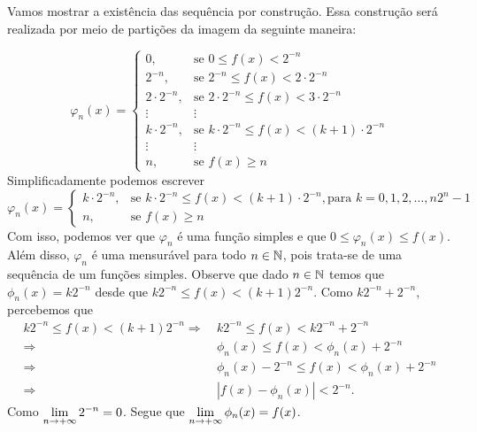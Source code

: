 \begin{prova}
	Vamos mostrar a existência das sequência por construção.
	Essa construção será realizada por meio de partições da imagem da seguinte maneira:
	
	$$
	\varphi_n(x) =\left\{
	\begin{array}{ll}
		0, & \textrm{se\ } 0 \leq f(x) < 2^{-n} \\
		2^{-n}, & \textrm{se\ } 2^{-n} \leq f(x) < 2\cdot2^{-n} \\
		2\cdot2^{-n}, & \textrm{se\ } 2\cdot2^{-n} \leq f(x) < 3\cdot2^{-n} \\
		\vdots & \vdots \\
		k\cdot2^{-n}, & \textrm{se\ } k\cdot2^{-n} \leq f(x) < (k+1)\cdot2^{-n} \\
		\vdots & \vdots \\
		n, & \textrm{se\ } f(x) \geq n
	\end{array}
	\right.
	$$
	Simplificadamente podemos escrever
	$$
	\varphi_n(x) =\left\{
	\begin{array}{ll}
		k\cdot2^{-n}, & \textrm{se\ } k\cdot2^{-n} \leq f(x) < (k+1)\cdot2^{-n}, \textrm{para } k = 0,1,2, \ldots, n2^n-1 \\
		n, & \textrm{se\ } f(x) \geq n
	\end{array}
	\right.
	$$
	Com isso, podemos ver que $\varphi_n$ é uma função simples e que $0\leq \varphi_n(x)\leq f(x)$. Além disso, $\varphi_n$ é uma mensurável para todo $n \in \operatorname{\mathbb{N}}$, pois trata-se de uma sequência de um funções simples.
	Observe que dado $n \in \operatorname{\mathbb{N}}$ temos que
	$\phi_n(x) = k2^{-n}$ desde que 
	$k2^{-n} \leq f(x) < (k+1)2^{-n}$.
	Como  $k2^{-n}+2^{-n}$, percebemos que
	\begin{align*}
		k2^{-n} \leq f(x) < (k+1)2^{-n}
		\Rightarrow &
		\ k2^{-n} \leq f(x) < k2^{-n} + 2^{-n}\\
		\Rightarrow &
		\ \phi_n(x) \leq f(x) < \phi_n(x) + 2^{-n}\\
		\Rightarrow &
		\ \phi_n(x) - 2^{-n} \leq f(x) < \phi_n(x) + 2^{-n}\\
		\Rightarrow &
		\ |f(x) - \phi_n(x)| <  2^{-n}.		
	\end{align*}
	Como 
	$\displaystyle \lim_{n \to +\infty} 2^{-n} = 0$.
	Segue que
	$\displaystyle \lim_{n \to +\infty} \phi_n(x) = f(x)$.
\end{prova}

